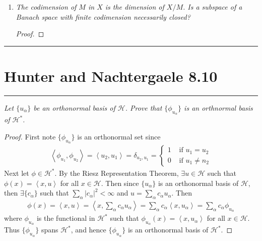 \documentclass{article} %
\theoremstyle{plain}
\newcommand{\VEC}[2]{\left\langle #1, #2 \right\rangle}
\newcommand{\Hilb}{\mathcal{H}}
\newcommand{\problem}[1]{
\vspace{.375cm}
\begin{minipage}{\textwidth}
    \begin{center}
        \noindent\rule{5cm}{1pt}
    \end{center}
    \section{\bf #1}
    \begin{center}
        \noindent\rule{5cm}{1pt}
    \end{center}
    \vspace{0.25cm}
\end{minipage}
}
\numberwithin{equation}{section} %
\numberwithin{figure}{section} %
\numberwithin{table}{section} %
\begin{document}
\begin{enumerate}[\it (a)]
\begin{proof}
            Now choose $x + M \in X/M$.  Then note $P_Nx \in N$ and
            \begin{align*}
                T(P_Nx) = P_Nx + M = (P_Nx + M) + (P_Mx + M) = (P_Nx + P_Mx) + M = x + M
            \end{align*}
            Thus $T$ is surjective.  Thus $T$ is a bijection.  Also, $T$ is a linear map since
            \begin{align*}
                T(\alpha x + \beta y) = (\alpha x + \beta y) + M = \alpha(x + M) + \beta(y + M) = \alpha Tx + \beta Ty
            \end{align*}
            Thus $N$ is linearly isomorphic to $X/M$.
        \end{proof}
    \item
        \emph{The \emph{codimension} of $M$ in $X$ is the dimension of $X/M$.  Is a subspace of a Banach space with finite codimension necessarily closed?}
        \begin{proof}
        \end{proof}
\end{enumerate}








\problem{Hunter and Nachtergaele 8.10}
\emph{Let $\{u_\alpha\}$ be an orthonormal basis of $\Hilb$.  Prove that $\{\phi_{u_\alpha}\}$ is an orthnormal basis of $\Hilb^*$.}

\begin{proof}
    First note $\{\phi_{u_\alpha}\}$ is an orthonormal set since
    \begin{align*}
        \VEC{\phi_{u_1}}{\phi_{u_2}} = \VEC{u_2}{u_1} = \delta_{u_2,u_1} = \begin{cases}
            1 & \text{ if } u_1 = u_2 \\
            0 & \text{ if } u_1 \neq n_2
        \end{cases}
    \end{align*}
    Next let $\phi \in \Hilb^*$.  By the Riesz Representation Theorem, $\exists u \in \Hilb$ such that $\phi(x) = \VEC{x}{u}$ for all $x \in \Hilb$.  Then since $\{u_\alpha\}$ is an orthonormal basis of $\Hilb$, then $\exists \{c_\alpha\}$ such that $\sum_{\alpha}|c_\alpha|^2 < \infty$ and $u = \sum_{\alpha}c_\alpha u_\alpha$.  Then
    \begin{align*}
        \phi(x) = \VEC{x}{u} = \VEC{x}{\sum_\alpha c_\alpha u_\alpha} = \sum_\alpha c_\alpha\VEC{x}{u_\alpha} = \sum_\alpha c_\alpha \phi_{u_\alpha}
    \end{align*}
    where $\phi_{u_\alpha}$ is the functional in $\Hilb^*$ such that $\phi_{u_\alpha}(x) = \VEC{x}{u_\alpha}$ for all $x \in \Hilb$.  Thus $\{\phi_{u_\alpha}\}$ spans $\Hilb^*$, and hence $\{\phi_{u_\alpha}\}$ is an orthonormal basis of $\Hilb^*$.
\end{proof}
\end{document}
